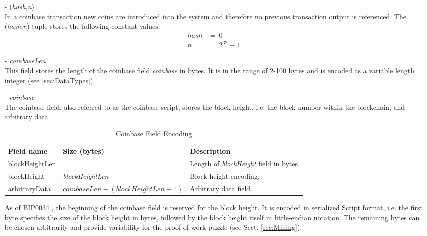 \begin{itemize}
\item[-] (\textit{hash},\textit{n})~\\
In a coinbase transaction new coins are introduced into the system and therefore no previous transaction output is referenced. The (\textit{hash},\textit{n}) tuple stores the following constant values:
\begin{equation}
\begin{split}
hash &=\ 0 \\
n &=\ 2^{32}-1
\end{split}
\end{equation}

\item[-] \textit{coinbaseLen}~\\
This field stores the length of the coinbase field \textit{coinbase} in bytes. It is in the range of 2-100 bytes and is encoded as a variable length integer (see \ref{sec:DataTypes}).

\item[-] \textit{coinbase}~\\
The coinbase field, also referred to as the coinbase script, stores the block height, i.e. the block number within the blockchain, and arbitrary data.~\\

\vspace{-10pt}
\begin{table}

	\centering
	\begin{tabularx}{320pt}{| m{70pt} | >{\centering} m{80pt} | X |}
	\hline
	\textbf{Field name} &
	\textbf{Size (bytes)} &
	\textbf{Description} \\ \hline \hline
	
	blockHeightLen &
	1 &
	Length of \textit{blockHeight} field in bytes. \\ \hline
	
	blockHeight &
	\textit{blockHeightLen} &
	Block height encoding. \\ \hline
	
	arbitraryData &
	$\textit{coinbaseLen} - (\textit{blockHeightLen} + 1)$ &
	Arbitrary data field. \\ \hline
	
	\end{tabularx}
	\vspace{5pt}
	\caption{Coinbase Field Encoding}
	\label{tab:CoinbaseFieldEncoding}
\end{table}
\vspace{-20pt}

As of BIP0034 \cite{BIP0034}, the beginning of the coinbase field is reserved for the block height. It is encoded in serialized Script format, i.e. the first byte specifies the size of the block height in bytes, followed by the block height itself in little-endian notation. The remaining bytes can be chosen arbitrarily and provide variability for the proof of work puzzle (see Sect. \ref{sec:Mining}).
\end{itemize} 


